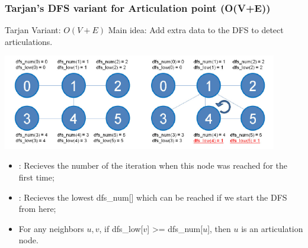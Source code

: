 \documentclass{beamer}
\begin{document}
\begin{frame}
  \frametitle{Tarjan's DFS variant for Articulation point (O(V+E))}
  {\smaller
    \begin{exampleblock}{Tarjan Variant: $O(V+E)$}
      Main idea: Add extra data to the DFS to detect articulations.
    \end{exampleblock}
      \begin{center}
        \includegraphics[width=0.9\textwidth]{../img/graph_articulation}
      \end{center}
    \begin{itemize}
    \item {}: Recieves the number of the iteration
      when this node was reached for the first time;
    \item {}: Recieves the lowest dfs\_num[] which
      can be reached if we start the DFS from here;
    \item For any neighbors $u,v$, if dfs\_low[$v$] >= dfs\_num[$u$],
      then $u$ is an articulation node.
    \end{itemize}
  }
\end{frame}
\end{document}
